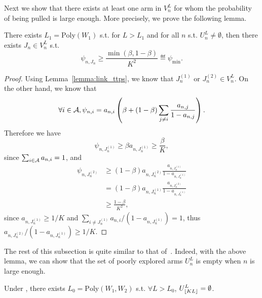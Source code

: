 Next we show that there exists at least one arm in $V_n^L$ for whom the probability of being pulled is large enough. More precisely, we prove the following lemma.

\begin{lemma}\label{lemma:psi_min_ttts}
    There exists $L_1 = \text{Poly}(W_1)$ s.t. for $L > L_1$ and for all $n$ s.t. $U_n^L \neq \emptyset$, then there exists $J_n \in V_n^L$ s.t.
    \[
        \psi_{n,J_n} \geq \frac{\min(\beta,1-\beta)}{K^2} \eqdef \psi_{\min}.
    \]
\end{lemma}

\begin{proof}
    Using Lemma~\ref{lemma:link_ttps}, we know that $J_n^{(1)}$ or $J_n^{(2)} \in V_n^L$. On the other hand, we know that
    \[
        \forall i\in\mathcal{A}, \psi_{n,i} = a_{n,i} \left(\beta + (1-\beta) \sum_{j\neq i} \frac{a_{n,j}}{1-a_{n,j}}\right).
    \]
    Therefore we have
    \[
        \psi_{n,J_n^{(1)}} \geq \beta a_{n,J_n^{(1)}} \geq \frac{\beta}{K},
    \]
    since $\sum_{i\in\mathcal{A}} a_{n,i} = 1$, and
    \begin{align*}
        \psi_{n,J_n^{(2)}} &\geq (1-\beta) a_{n,J_n^{(2)}} \frac{a_{n,J_n^{(1)}}}{1-a_{n,J_n^{(1)}}}\\
                           &= (1-\beta) a_{n,J_n^{(1)}} \frac{a_{n,J_n^{(2)}}}{1-a_{n,J_n^{(1)}}}\\
                           &\geq \frac{1-\beta}{K^2},
    \end{align*}
    since $a_{n,J_n^{(1)}} \geq 1/K$ and $\sum_{i\neq J_n^{(1)}} a_{n,i}/(1-a_{n,J_n^{(1)}}) = 1 $, thus $a_{n,J_n^{(2)}}/(1-a_{n,J_n^{(1)}}) \geq 1/K$.
\end{proof}

The rest of this subsection is quite similar to that of~\cite{qin2017ttei}. Indeed, with the above lemma, we can show that the set of poorly explored arms $U_n^L$ is empty when $n$ is large enough.

\begin{lemma}\label{lemma:poorly_explored_ttts}
    Under \TTTS, there exists $L_0 = \text{Poly}(W_1,W_2)$ s.t. $\forall L > L_0$, $U_{\lfloor KL\rfloor}^L = \emptyset$.
\end{lemma}

